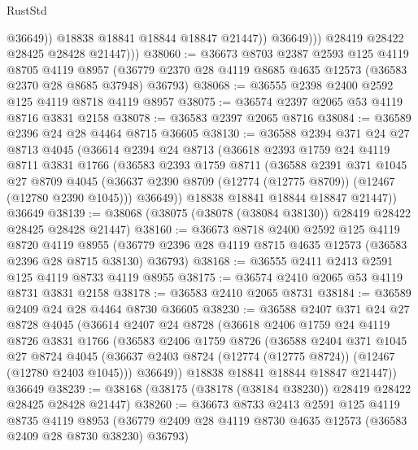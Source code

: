 \begin{lexlean}{RustStd}
\begin{coremodule}
                        @36649))
                    @18838
                    @18841
                    @18844
                    @18847
                    @21447))
                @36649)))
          @28419
          @28422
          @28425
          @28428
          @21447)))
@38060 := @36673
    @8703
    @2387
    @2593
    @125
    @4119
    @8705
    @4119
    @8957
    (@36779 @2370 @28 @4119 @8685 @4635 @12573 (@36583 @2370 @28 @8685 @37948) @36793)
@38068 := @36555 @2398 @2400 @2592 @125 @4119 @8718 @4119 @8957
@38075 := @36574 @2397 @2065 @53 @4119 @8716 @3831 @2158
@38078 := @36583 @2397 @2065 @8716
@38084 := @36589 @2396 @24 @28 @4464 @8715 @36605
@38130 := @36588
    @2394
    @371
    @24
    @27
    @8713
    @4045
    (@36614
      @2394
      @24
      @8713
      (@36618
        @2393
        @1759
        @24
        @4119
        @8711
        @3831
        @1766
        (@36583
          @2393
          @1759
          @8711
          (@36588
            @2391
            @371
            @1045
            @27
            @8709
            @4045
            (@36637 @2390 @8709 (@12774 (@12775 @8709)) (@12467 (@12780 @2390 @1045)))
            @36649))
        @18838
        @18841
        @18844
        @18847
        @21447))
    @36649
@38139 := @38068 (@38075 (@38078 (@38084 @38130)) @28419 @28422 @28425 @28428 @21447)
@38160 := @36673
    @8718
    @2400
    @2592
    @125
    @4119
    @8720
    @4119
    @8955
    (@36779 @2396 @28 @4119 @8715 @4635 @12573 (@36583 @2396 @28 @8715 @38130) @36793)
@38168 := @36555 @2411 @2413 @2591 @125 @4119 @8733 @4119 @8955
@38175 := @36574 @2410 @2065 @53 @4119 @8731 @3831 @2158
@38178 := @36583 @2410 @2065 @8731
@38184 := @36589 @2409 @24 @28 @4464 @8730 @36605
@38230 := @36588
    @2407
    @371
    @24
    @27
    @8728
    @4045
    (@36614
      @2407
      @24
      @8728
      (@36618
        @2406
        @1759
        @24
        @4119
        @8726
        @3831
        @1766
        (@36583
          @2406
          @1759
          @8726
          (@36588
            @2404
            @371
            @1045
            @27
            @8724
            @4045
            (@36637 @2403 @8724 (@12774 (@12775 @8724)) (@12467 (@12780 @2403 @1045)))
            @36649))
        @18838
        @18841
        @18844
        @18847
        @21447))
    @36649
@38239 := @38168 (@38175 (@38178 (@38184 @38230)) @28419 @28422 @28425 @28428 @21447)
@38260 := @36673
    @8733
    @2413
    @2591
    @125
    @4119
    @8735
    @4119
    @8953
    (@36779 @2409 @28 @4119 @8730 @4635 @12573 (@36583 @2409 @28 @8730 @38230) @36793)

\end{coremodule}
\end{lexlean}
